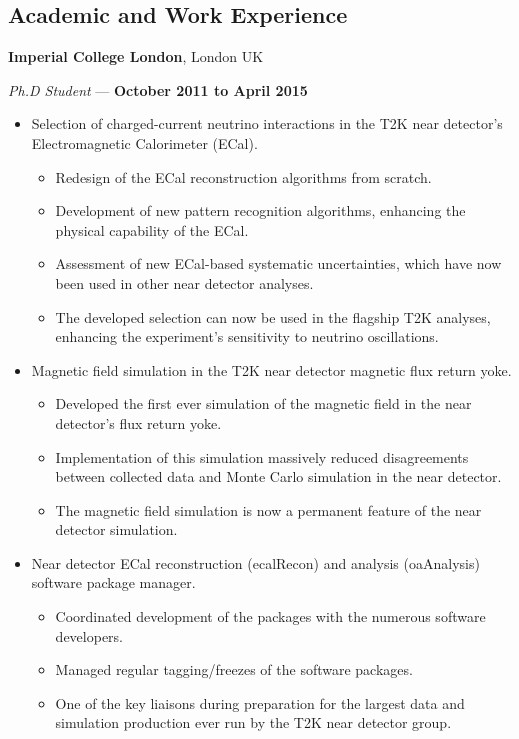 \documentclass[margin,line]{res}
\begin{document}
\begin{resume}
\section{\sc Academic and Work Experience}
{\bf Imperial College London}, London UK

\vspace{-.3cm}
{\em Ph.D Student} --- {\bf October 2011 to April 2015}%
\begin{itemize}
\item Selection of charged-current neutrino interactions in the T2K near detector's Electromagnetic Calorimeter (ECal).
\begin{itemize}
\item Redesign of the ECal reconstruction algorithms from scratch.
\item Development of new pattern recognition algorithms, enhancing the physical capability of the ECal.
\item Assessment of new ECal-based systematic uncertainties, which have now been used in other near detector analyses.
\item The developed selection can now be used in the flagship T2K analyses, enhancing the experiment's sensitivity to neutrino oscillations.
\end{itemize}
\item Magnetic field simulation in the T2K near detector magnetic flux return yoke.
\begin{itemize}
\item Developed the first ever simulation of the magnetic field in the near detector's flux return yoke.
\item Implementation of this simulation massively reduced disagreements between collected data and Monte Carlo simulation in the near detector.
\item The magnetic field simulation is now a permanent feature of the near detector simulation.
\end{itemize}
\item Near detector ECal reconstruction (ecalRecon) and analysis (oaAnalysis) software package manager.
\begin{itemize}
\item Coordinated development of the packages with the numerous software developers.
\item Managed regular tagging/freezes of the software packages.
\item One of the key liaisons during preparation for the largest data and simulation production ever run by the T2K near detector group.
\end{itemize}
\end{itemize}


\end{resume}
\end{document}
